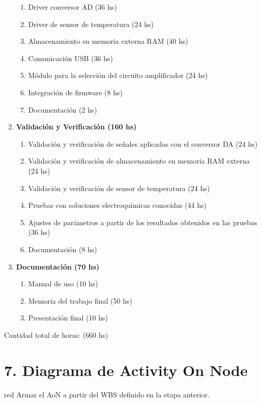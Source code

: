 \documentclass[11pt]{charter}
\begin{document}
\begin{enumerate}
\begin{enumerate}
		\item Driver conversor AD (36 hs)
		\item Driver de sensor de temperatura (24 hs)
		\item Almacenamiento en memoria externa RAM (40 hs)
		\item Comunicación USB (36 hs)
		\item Módulo para la selección del circuito amplificador (24 hs)	
		\item Integración de firmware (8 hs)
		\item Documentación (2 hs)
	\end{enumerate}		
\item \textbf{Validación y Verificación (160 hs)}
	\begin{enumerate}
		\item Validación y verificación de señales aplicadas con el conversor DA (24 hs)
		\item Validación y verificación de almacenamiento en memoria RAM externa (24 hs)
		\item Validación y verificación de sensor de temperatura (24 hs)
		\item Pruebas con soluciones electroquímicas conocidas (44 hs)
		\item Ajustes de parámetros a partir de los resultados obtenidos en las pruebas (36 hs)
		\item Documentación (8 hs)
	\end{enumerate}
\item \textbf{Documentación (70 hs)}
	\begin{enumerate}
		\item Manual de uso (10 hs)
		\item Memoria del trabajo final (50 hs)
		\item Presentación final (10 hs)
	\end{enumerate}
\end{enumerate}

Cantidad total de horas: (660 hs)


\section{7. Diagrama de Activity On Node}
\label{sec:AoN}

\begin{consigna}{red}
Armar el AoN a partir del WBS definido en la etapa anterior. 



\end{consigna}
\end{document}
